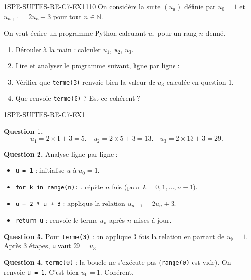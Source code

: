 
\begin{exercice}{1SPE-SUITES-RE-C7-EX1}{1}{10}
On considère la suite $(u_n)$ définie par $u_0 = 1$ et $u_{n+1} = 2u_n + 3$ pour tout $n \in \mathbb{N}$.

On veut écrire un programme Python calculant $u_n$ pour un rang $n$ donné.

\begin{enumerate}
  \item Dérouler à la main : calculer $u_1$, $u_2$, $u_3$.
  \item Lire et analyser le programme suivant, ligne par ligne :

\medskip


  \item Vérifier que \texttt{terme(3)} renvoie bien la valeur de $u_3$ calculée en question 1.
  \item Que renvoie \texttt{terme(0)} ? Est-ce cohérent ?
\end{enumerate}
\end{exercice}


\begin{corrige}{1SPE-SUITES-RE-C7-EX1}


\textbf{Question 1.}
\[
u_1 = 2 \times 1 + 3 = 5. \quad u_2 = 2 \times 5 + 3 = 13. \quad u_3 = 2 \times 13 + 3 = 29.
\]


\textbf{Question 2.} Analyse ligne par ligne :
\begin{itemize}
  \item \texttt{u = 1} : initialise $u$ à $u_0 = 1$.
  \item \texttt{for k in range(n):} : répète $n$ fois (pour $k = 0, 1, \ldots, n-1$).
  \item \texttt{u = 2 * u + 3} : applique la relation $u_{n+1} = 2u_n + 3$.
  \item \texttt{return u} : renvoie le terme $u_n$ après $n$ mises à jour.
\end{itemize}

\textbf{Question 3.} Pour \texttt{terme(3)} : on applique $3$ fois la relation en partant de $u_0 = 1$.
Après $3$ étapes, \texttt{u} vaut $29 = u_3$. \checkmark


\textbf{Question 4.} \texttt{terme(0)} : la boucle ne s'exécute pas (\texttt{range(0)} est vide). On renvoie \texttt{u = 1}. C'est bien $u_0 = 1$. Cohérent. \checkmark

\end{corrige}

